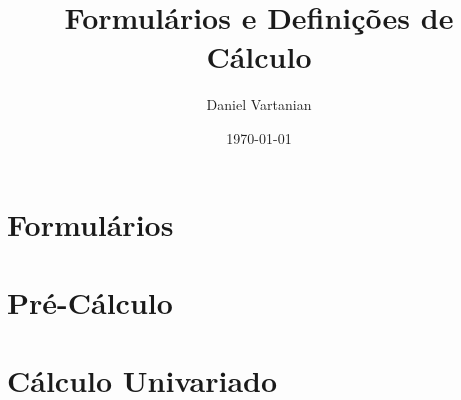 \documentclass[12pt]{article}
\title{Formulários e Definições de Cálculo}
\author{Daniel Vartanian}
\date{\today}
\begin{document}

	

	

	\part{Formulários}

		

		

		

	\part{Pré-Cálculo}

		

		

		

		

		

	\part{Cálculo Univariado}

		
\end{document}
